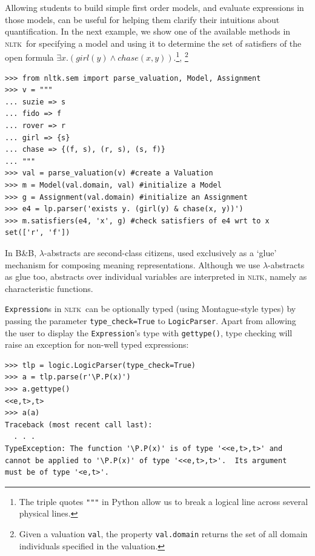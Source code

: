 \documentclass[11pt, a4paper]{article}
\newcommand{\BB}{\textsc{B{\small\&}B}}
\newcommand{\NLTK}{\textsc{nltk}}
\begin{document}
Allowing students to build simple first order models, and evaluate
expressions in those models, can be useful for helping them clarify
their intuitions about quantification. In the next example, we show
one of the available methods in \NLTK\ for specifying a model and
using it to determine the set of satisfiers of the open formula
$\exists x.(\mathit{girl}(y) \wedge
\mathit{chase}(x,y))$.\footnote{The triple quotes \texttt{"""} in
  Python allow us to break a logical line across several physical
  lines.},
\footnote{Given a valuation \texttt{val}, the property
  \texttt{val.domain} returns the set of all domain individuals
  specified in the valuation.}
\begin{Verbatim}
>>> from nltk.sem import parse_valuation, Model, Assignment
>>> v = """
... suzie => s
... fido => f
... rover => r
... girl => {s}
... chase => {(f, s), (r, s), (s, f)}
... """
>>> val = parse_valuation(v) #create a Valuation
>>> m = Model(val.domain, val) #initialize a Model
>>> g = Assignment(val.domain) #initialize an Assignment
>>> e4 = lp.parser('exists y. (girl(y) & chase(x, y))')
>>> m.satisfiers(e4, 'x', g) #check satisfiers of e4 wrt to x
set(['r', 'f'])
\end{Verbatim}

In \BB, $\lambda$-abstracts are second-class citizens, used
exclusively as a `glue' mechanism for composing meaning
representations. Although we use $\lambda$-abstracts as glue too,
abstracts over individual variables are interpreted in \NLTK, namely as
characteristic functions.

\texttt{Expression}s in \NLTK\ can be optionally typed (using
Montague-style types) by passing the parameter \texttt{type\_check=True} to
\texttt{LogicParser}.  Apart from allowing the user to display the
\texttt{Expression}'s type with \texttt{gettype()}, type checking will
raise an exception for non-well typed expressions:
\begin{Verbatim}
>>> tlp = logic.LogicParser(type_check=True)
>>> a = tlp.parse(r'\P.P(x)')
>>> a.gettype()
<<e,t>,t>
>>> a(a)
Traceback (most recent call last):
  . . .
TypeException: The function '\P.P(x)' is of type '<<e,t>,t>' and
cannot be applied to '\P.P(x)' of type '<<e,t>,t>'.  Its argument
must be of type '<e,t>'.
\end{Verbatim}
\end{document}
